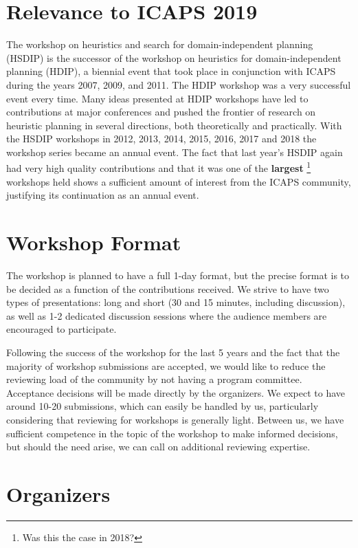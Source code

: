 \documentclass[10pt]{article}
\begin{document}

\section*{Relevance to ICAPS 2019}

The workshop on heuristics and search for domain-independent planning
(HSDIP) is the successor of the workshop on heuristics for
domain-independent planning (HDIP), a biennial event that took place
in conjunction with ICAPS during the years 2007, 2009, and 2011. The
HDIP workshop was a very successful event every time. Many ideas
presented at HDIP workshops have led to contributions at major
conferences and pushed the frontier of research on heuristic planning
in several directions, both theoretically and practically.
%
With the HSDIP workshops in 2012, 2013, 2014, 2015, 2016, 2017 and 2018 the
workshop series became an annual event. The fact that last year's HSDIP again had very
high quality contributions and that it was one of the \textbf{largest}
\footnote{Was this the case in 2018?}
workshops held shows a sufficient amount of interest from the ICAPS community, justifying its
continuation as an annual event.

\section*{Workshop Format}

The workshop is planned to have a full 1-day format, but the precise
format is to be decided as a function of the contributions received.
We strive to have two types of presentations: long and short (30 and
15 minutes, including discussion), as well as 1-2 dedicated discussion
sessions where the audience members are encouraged to participate.

Following the success of the workshop for the last 5 years and the fact
that the majority of workshop submissions are accepted, we would like to reduce
the reviewing load of the community by not having a program
committee. Acceptance decisions will be made directly by the
organizers. We expect to have around 10-20 submissions, which can
easily be handled by us, particularly considering that reviewing for
workshops is generally light. Between us, we have sufficient
competence in the topic of the workshop to make informed decisions,
but should the need arise, we can call on additional reviewing
expertise.

\section*{Organizers}
\end{document}
